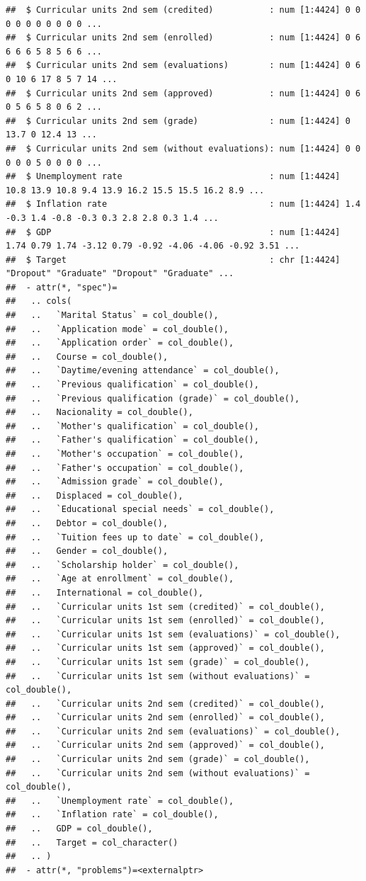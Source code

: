 \documentclass[
]{article}
\begin{document}
\begin{verbatim}
##  $ Curricular units 2nd sem (credited)           : num [1:4424] 0 0 0 0 0 0 0 0 0 0 ...
##  $ Curricular units 2nd sem (enrolled)           : num [1:4424] 0 6 6 6 6 5 8 5 6 6 ...
##  $ Curricular units 2nd sem (evaluations)        : num [1:4424] 0 6 0 10 6 17 8 5 7 14 ...
##  $ Curricular units 2nd sem (approved)           : num [1:4424] 0 6 0 5 6 5 8 0 6 2 ...
##  $ Curricular units 2nd sem (grade)              : num [1:4424] 0 13.7 0 12.4 13 ...
##  $ Curricular units 2nd sem (without evaluations): num [1:4424] 0 0 0 0 0 5 0 0 0 0 ...
##  $ Unemployment rate                             : num [1:4424] 10.8 13.9 10.8 9.4 13.9 16.2 15.5 15.5 16.2 8.9 ...
##  $ Inflation rate                                : num [1:4424] 1.4 -0.3 1.4 -0.8 -0.3 0.3 2.8 2.8 0.3 1.4 ...
##  $ GDP                                           : num [1:4424] 1.74 0.79 1.74 -3.12 0.79 -0.92 -4.06 -4.06 -0.92 3.51 ...
##  $ Target                                        : chr [1:4424] "Dropout" "Graduate" "Dropout" "Graduate" ...
##  - attr(*, "spec")=
##   .. cols(
##   ..   `Marital Status` = col_double(),
##   ..   `Application mode` = col_double(),
##   ..   `Application order` = col_double(),
##   ..   Course = col_double(),
##   ..   `Daytime/evening attendance` = col_double(),
##   ..   `Previous qualification` = col_double(),
##   ..   `Previous qualification (grade)` = col_double(),
##   ..   Nacionality = col_double(),
##   ..   `Mother's qualification` = col_double(),
##   ..   `Father's qualification` = col_double(),
##   ..   `Mother's occupation` = col_double(),
##   ..   `Father's occupation` = col_double(),
##   ..   `Admission grade` = col_double(),
##   ..   Displaced = col_double(),
##   ..   `Educational special needs` = col_double(),
##   ..   Debtor = col_double(),
##   ..   `Tuition fees up to date` = col_double(),
##   ..   Gender = col_double(),
##   ..   `Scholarship holder` = col_double(),
##   ..   `Age at enrollment` = col_double(),
##   ..   International = col_double(),
##   ..   `Curricular units 1st sem (credited)` = col_double(),
##   ..   `Curricular units 1st sem (enrolled)` = col_double(),
##   ..   `Curricular units 1st sem (evaluations)` = col_double(),
##   ..   `Curricular units 1st sem (approved)` = col_double(),
##   ..   `Curricular units 1st sem (grade)` = col_double(),
##   ..   `Curricular units 1st sem (without evaluations)` = col_double(),
##   ..   `Curricular units 2nd sem (credited)` = col_double(),
##   ..   `Curricular units 2nd sem (enrolled)` = col_double(),
##   ..   `Curricular units 2nd sem (evaluations)` = col_double(),
##   ..   `Curricular units 2nd sem (approved)` = col_double(),
##   ..   `Curricular units 2nd sem (grade)` = col_double(),
##   ..   `Curricular units 2nd sem (without evaluations)` = col_double(),
##   ..   `Unemployment rate` = col_double(),
##   ..   `Inflation rate` = col_double(),
##   ..   GDP = col_double(),
##   ..   Target = col_character()
##   .. )
##  - attr(*, "problems")=<externalptr>
\end{verbatim}
\end{document}
